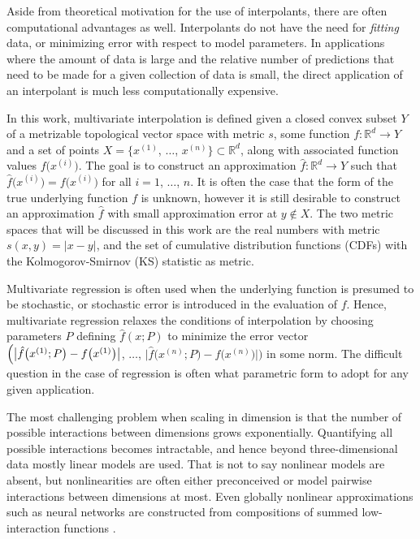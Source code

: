 \documentclass[smallextended,final]{svjour3}  %
\begin{document}
Aside from theoretical motivation for the use of interpolants, there
are often computational advantages as well. Interpolants do not have
the need for \textit{fitting} data, or minimizing error with respect
to model parameters. In applications where the amount of data is large
and the relative number of predictions that need to be made for a
given collection of data is small, the direct application of an
interpolant is much less computationally expensive.

In this work, multivariate interpolation is defined given a closed
convex subset $Y$ of a metrizable topological vector space with metric
$s$, some function $f:\mathbb{R}^d \rightarrow Y$ and a set of points
$X = \bigl\{x^{(1)}$, $\ldots$, $x^{(n)}\bigr\} \subset \mathbb{R}^d$,
along with associated function values $f\bigl(x^{(i)}\bigr)$. The goal
is to construct an approximation $\hat f: \mathbb{R}^d \rightarrow Y$
such that $\hat f\bigl(x^{(i)}\bigr) = f\bigl(x^{(i)}\bigr)$ for all
$i = 1$, $\ldots$, $n$. It is often the case that the form of the true
underlying function $f$ is unknown, however it is still desirable to
construct an approximation $\hat f$ with small approximation error at
$y \notin X$. The two metric spaces that will be discussed in this
work are the real numbers with metric $s(x,y) = |x-y|$, and the set of
cumulative distribution functions (CDFs) with the Kolmogorov-Smirnov
(KS) statistic \cite{lilliefors1967kolmogorov} as metric.

Multivariate regression is often used when the underlying function is
presumed to be stochastic, or stochastic error is introduced in the
evaluation of $f$. Hence, multivariate regression relaxes the
conditions of interpolation by choosing parameters $P$ defining $\hat
f(x;P)$ to minimize the error vector $\Bigl( \bigl | \hat f
\bigl(x^{(1)};P\bigr) - f\bigl(x^{(1)}\bigr) \bigr|$, $\ldots$, $\bigl
| \hat f \bigl(x^{(n)}; P\bigr) - f\bigl(x^{(n)}\bigr) \bigr | \Bigr)$
in some norm. The difficult question in the case of regression is
often what parametric form to adopt for any given application.

The most challenging problem when scaling in dimension is that the
number of possible interactions between dimensions grows
exponentially. Quantifying all possible interactions becomes
intractable, and hence beyond three-dimensional data mostly linear
models are used. That is not to say nonlinear models are absent, but
nonlinearities are often either preconceived or model pairwise
interactions between dimensions at most. Even globally nonlinear
approximations such as neural networks are constructed from
compositions of summed low-interaction functions
\cite{clevert2015fast}.
\end{document}
